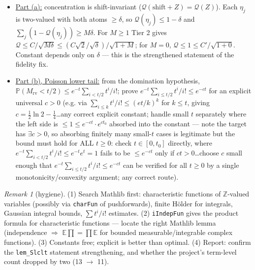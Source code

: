 \documentclass[11pt]{article}
\theoremstyle{plain}
\theoremstyle{remark}
\newtheorem{remark}{Remark}
\newcommand{\E}{\mathbb{E}}\newcommand{\PP}{\mathbb{P}}\newcommand{\R}{\mathbb{R}}\newcommand{\Z}{\mathbb{Z}}
\newcommand{\Q}{\mathcal Q}
\begin{document}
\begin{itemize}
\item[(f)] \underline{Part (a):} concentration is shift-invariant
($\Q(\mathrm{shift}+Z)=\Q(Z)$). Each $\eta_j$ is two-valued with both atoms
$\ge\delta$, so $\Q(\eta_j)\le1-\delta$ and $\sum_j(1-\Q(\eta_j))\ge M\delta$.
For $M\ge1$ Tier 2 gives $\Q\le C/\sqrt{M\delta}\le(C\sqrt2/\sqrt\delta)/
\sqrt{1+M}$; for $M=0$, $\Q\le1\le C'/\sqrt{1+0}$. Constant depends only on
$\delta$ --- this is the strengthened statement of the fidelity fix.
\item[(g)] \underline{Part (b), Poisson lower tail:} from the domination
hypothesis, $\PP(M_{\mathrm{rv}}<t/2)\le e^{-t}\sum_{i<t/2}t^i/i!$; prove
$e^{-t}\sum_{i\le t/2}t^i/i!\le e^{-ct}$ for an explicit universal $c>0$ (e.g.
via $\sum_{i\le k}t^i/i!\le(et/k)^k$ for $k\le t$, giving
$c=\tfrac12\ln2-\tfrac14$\dots any correct explicit constant; handle small $t$
separately where the left side is $\le1\le e^{-ct}\cdot e^{c t_0}$ absorbed
into the constant --- note the target has $\exists c>0$, so absorbing
finitely many small-$t$ cases is legitimate but the bound must hold for ALL
$t\ge0$: check $t\in[0,t_0]$ directly, where
$e^{-t}\sum_{i<t/2}t^i/i!\le e^{-t}e^{t}=1$ fails to be $\le e^{-ct}$ only if
$ct>0$\dots choose $c$ small enough that $e^{-t}\sum_{i\le t/2}t^i/i!\le
e^{-ct}$ can be verified for all $t\ge0$ by a single monotonicity/convexity
argument; any correct route).
\end{itemize}

\begin{remark}[hygiene]
(1) Search Mathlib first: characteristic functions of $\Z$-valued variables
(possibly via \texttt{charFun} of pushforwards), finite H\"older for
integrals, Gaussian integral bounds, $\sum t^i/i!$ estimates.
(2) \texttt{iIndepFun} gives the product formula for characteristic functions
--- locate the right Mathlib lemma (independence $\Rightarrow$
$\E\prod=\prod\E$ for bounded measurable/integrable complex functions).
(3) Constants free; explicit is better than optimal.
(4) Report: confirm the \texttt{lem\_Slclt} statement strengthening, and
whether the project's term-level count dropped by two (13 $\to$ 11).
\end{remark}
\end{document}
